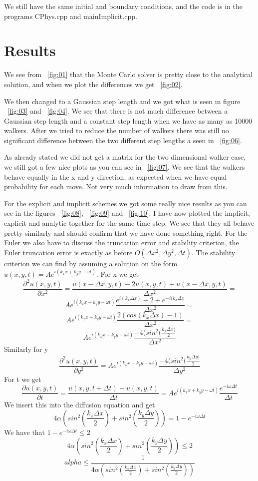 \documentclass[a4wide,12pt]{article}
\begin{document}
We still have the same initial and boundary conditions, and the code is in the programs CPhys.cpp and mainImplicit.cpp. 

\section*{Results}

We see from ~\ref{fig:01} that the Monte Carlo solver is pretty close to the analytical solution, and when we plot the differences we get ~\ref{fig:02}.

We then changed to a Gaussian step length  and we got what is seen in figure ~\ref{fig:03} and ~\ref{fig:04}. We see that there is not much difference
between a Gaussian step length and a constant step length when we have as many as 10000 walkers. After we tried to reduce the number of walkers there was still no significant difference between the two different step lengths a seen in ~\ref{fig:06}. 

As already stated we did not get a matrix for the two dimensional walker case, we still got a few nice plots as you can see in ~\ref{fig:07}. We see that the walkers behave equally in the x and y direction, as expected when we have equal probability for each move. Not very much information to draw from this.  

For the explicit and implicit schemes we got some really nice results as you can see in the figures ~\ref{fig:08}, ~\ref{fig:09} and ~\ref{fig:10}. I have now plotted the implicit, explicit and analytic together for the same time step. 
We see that they all behave pretty similarly and should confirm that we have done something right. 
For the Euler we also have to discuss the truncation error and stability criterion, the Euler truncation error is exactly as before
$O(\Delta x^{2},\Delta y^{2},\Delta t)$. 
The stability criterion we can find by assuming a solution on the form $u(x,y,t)=Ae^{i(k_{x}x+k_{y}y-\omega t)}$.
For x we get
\[
\frac{\partial^{2}u(x,y,t)}{\partial x^{2}} = \frac{u(x-\Delta x,y,t)-2u(x,y,t)+u(x-\Delta x,y,t)}{\Delta x^2} =
\]
\[
Ae^{i(k_{x}x+k_{y}y-\omega t)}\frac{e^{i(k_{x}\Delta x)}-2+e^{-i(k_{x}\Delta x}}{\Delta x^2} =
\]
\[
Ae^{i(k_{x}x+k_{y}y-\omega t)}\frac{2(cos(k_{x}\Delta x)-1)}{\Delta x^2} =
\]
\[
Ae^{i(k_{x}x+k_{y}y-\omega t)}\frac{-4(sin^{2}(\frac{k_{x}\Delta x)}{2}}{\Delta x^2}
\]
Similarly for y
\[
\frac{\partial^{2}u(x,y,t)}{\partial y^{2}} = Ae^{i(k_{x}x+k_{y}y-\omega t)}\frac{-4(sin^{2}(\frac{k_{y}\Delta y)}{2}}{\Delta y^2}
\]
For t we get
\[
\frac{\partial u(x,y,t)}{\partial t} = \frac{u(x,y,t+\Delta t)-u(x,y,t)}{\Delta t} = Ae^{i(k_{x}x+k_{y}y-\omega t)}\frac{e^{-i\omega \Delta t}}{\Delta t}
\]
We insert this into the diffusion equation and get
\[
4\alpha(sin^{2}(\frac{k_{x}\Delta x}{2})+sin^{2}(\frac{k_{y}\Delta y}{2})) = 1-e^{-i\omega\Delta t}
\]
We have that $1-e^{-i\omega\Delta t} \le 2$
\[
4\alpha(sin^{2}(\frac{k_{x}\Delta x}{2})+sin^{2}(\frac{k_{y}\Delta y}{2})) \le 2
\]
\[
alpha \le \frac{1}{4\alpha(sin^{2}(\frac{k_{x}\Delta x}{2})+sin^{2}(\frac{k_{y}\Delta y}{2}))}
\]
 
\end{document}
